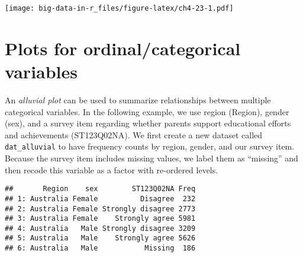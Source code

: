 \documentclass[
]{book}
\newenvironment{Shaded}{\begin{snugshade}}{\end{snugshade}}
\newcommand{\AttributeTok}[1]{\textcolor[rgb]{0.77,0.63,0.00}{#1}}
\newcommand{\ErrorTok}[1]{\textcolor[rgb]{0.64,0.00,0.00}{\textbf{#1}}}
\newcommand{\FunctionTok}[1]{\textcolor[rgb]{0.00,0.00,0.00}{#1}}
\newcommand{\NormalTok}[1]{#1}
\newcommand{\OtherTok}[1]{\textcolor[rgb]{0.56,0.35,0.01}{#1}}
\newcommand{\SpecialCharTok}[1]{\textcolor[rgb]{0.00,0.00,0.00}{#1}}
\newcommand{\StringTok}[1]{\textcolor[rgb]{0.31,0.60,0.02}{#1}}
\begin{document}
\texttt{[image: big-data-in-r\_files/figure-latex/ch4-23-1.pdf]}

\hypertarget{plots-for-ordinalcategorical-variables}{%
\section{Plots for ordinal/categorical variables}\label{plots-for-ordinalcategorical-variables}}

An \emph{alluvial plot} can be used to summarize relationships between multiple categorical variables. In the following example, we use region (Region), gender (sex), and a survey item regarding whether parents support educational efforts and achievements (ST123Q02NA). We first create a new dataset called \texttt{dat\_alluvial} to have frequency counts by region, gender, and our survey item. Because the survey item includes missing values, we label them as ``missing'' and then recode this variable as a factor with re-ordered levels.

\begin{Shaded}
\end{Shaded}

\begin{verbatim}
##       Region    sex        ST123Q02NA Freq
## 1: Australia Female          Disagree  232
## 2: Australia Female Strongly disagree 2773
## 3: Australia Female    Strongly agree 5981
## 4: Australia   Male Strongly disagree 3209
## 5: Australia   Male    Strongly agree 5626
## 6: Australia   Male           Missing  186
\end{verbatim}
\end{document}
